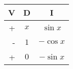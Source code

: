 \begin{tabular}{r|cc}
    V & D & I\\
    \hline
    + & $x$ & $\sin{x}$\\
    - & $1$ & $-\cos{x}$\\
    + & $0$ & $-\sin{x}$
\end{tabular}\\
